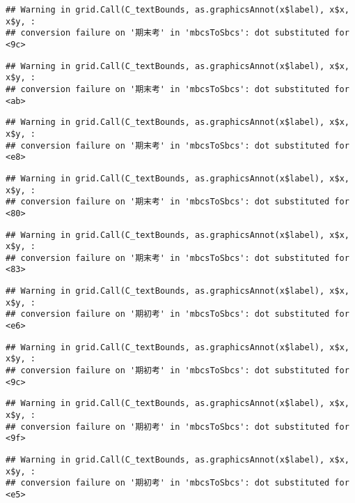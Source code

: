 \documentclass[
]{book}
\begin{document}
\begin{verbatim}
## Warning in grid.Call(C_textBounds, as.graphicsAnnot(x$label), x$x, x$y, :
## conversion failure on '期末考' in 'mbcsToSbcs': dot substituted for <9c>
\end{verbatim}

\begin{verbatim}
## Warning in grid.Call(C_textBounds, as.graphicsAnnot(x$label), x$x, x$y, :
## conversion failure on '期末考' in 'mbcsToSbcs': dot substituted for <ab>
\end{verbatim}

\begin{verbatim}
## Warning in grid.Call(C_textBounds, as.graphicsAnnot(x$label), x$x, x$y, :
## conversion failure on '期末考' in 'mbcsToSbcs': dot substituted for <e8>
\end{verbatim}

\begin{verbatim}
## Warning in grid.Call(C_textBounds, as.graphicsAnnot(x$label), x$x, x$y, :
## conversion failure on '期末考' in 'mbcsToSbcs': dot substituted for <80>
\end{verbatim}

\begin{verbatim}
## Warning in grid.Call(C_textBounds, as.graphicsAnnot(x$label), x$x, x$y, :
## conversion failure on '期末考' in 'mbcsToSbcs': dot substituted for <83>
\end{verbatim}

\begin{verbatim}
## Warning in grid.Call(C_textBounds, as.graphicsAnnot(x$label), x$x, x$y, :
## conversion failure on '期初考' in 'mbcsToSbcs': dot substituted for <e6>
\end{verbatim}

\begin{verbatim}
## Warning in grid.Call(C_textBounds, as.graphicsAnnot(x$label), x$x, x$y, :
## conversion failure on '期初考' in 'mbcsToSbcs': dot substituted for <9c>
\end{verbatim}

\begin{verbatim}
## Warning in grid.Call(C_textBounds, as.graphicsAnnot(x$label), x$x, x$y, :
## conversion failure on '期初考' in 'mbcsToSbcs': dot substituted for <9f>
\end{verbatim}

\begin{verbatim}
## Warning in grid.Call(C_textBounds, as.graphicsAnnot(x$label), x$x, x$y, :
## conversion failure on '期初考' in 'mbcsToSbcs': dot substituted for <e5>
\end{verbatim}
\end{document}
